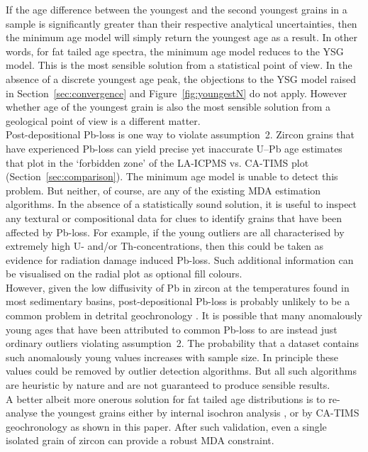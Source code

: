 \documentclass{article}
\begin{document}
If the age difference between the youngest and the second youngest
grains in a sample is significantly greater than their respective
analytical uncertainties, then the minimum age model will simply
return the youngest age as a result. In other words, for fat tailed
age spectra, the minimum age model reduces to the YSG model. This is
the most sensible solution from a statistical point of view. In the
absence of a discrete youngest age peak, the objections to the YSG
model raised in Section~\ref{sec:convergence} and
Figure~\ref{fig:youngestN} do not apply. However whether age of the
youngest grain is also the most sensible solution from a geological
point of view is a different matter.\\

Post-depositional Pb-loss is one way to violate assumption~2. Zircon
grains that have experienced Pb-loss can yield precise yet inaccurate
U--Pb age estimates that plot in the `forbidden zone' of the LA-ICPMS
vs. CA-TIMS plot (Section~\ref{sec:comparison}). The minimum age model
is unable to detect this problem. But neither, of course, are any of
the existing MDA estimation algorithms. In the absence of a
statistically sound solution, it is useful to inspect any textural or
compositional data for clues to identify grains that have been
affected by Pb-loss. For example, if the young outliers are all
characterised by extremely high U- and/or Th-concentrations, then this
could be taken as evidence for radiation damage induced Pb-loss. Such
additional information can be visualised on the radial plot as
optional fill colours.\\

However, given the low diffusivity of Pb in zircon at the temperatures
found in most sedimentary basins, post-depositional Pb-loss is
probably unlikely to be a common problem in detrital geochronology
\citep{cherniak2001, copeland2020}. It is possible that many
anomalously young ages that have been attributed to common Pb-loss to
are instead just ordinary outliers violating assumption~2. The
probability that a dataset contains such anomalously young values
increases with sample size. In principle these values could be removed
by outlier detection algorithms. But all such algorithms are heuristic
by nature and are not guaranteed to produce sensible results.\\

A better albeit more onerous solution for fat tailed age distributions
is to re-analyse the youngest grains either by internal isochron
analysis \citep{nemchin2005}, or by CA-TIMS geochronology as shown in
this paper. After such validation, even a single isolated grain of
zircon can provide a robust MDA constraint.
\end{document}
